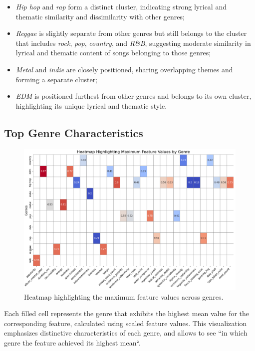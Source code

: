 \begin{itemize}
  \item \textit{Hip hop} and \textit{rap} form a distinct cluster, indicating
    strong lyrical and thematic similarity and dissimilarity with other genres;
  \item \textit{Reggae} is slightly separate from other genres but still
    belongs to the cluster that includes \textit{rock}, \textit{pop},
    \textit{country}, and \textit{R\&B}, suggesting moderate similarity in
    lyrical and thematic content of songs belonging to those genres;
  \item \textit{Metal} and \textit{indie} are closely positioned, sharing
    overlapping themes and forming a  separate cluster;
  \item \textit{EDM} is positioned furthest from other genres and belongs to
    its own cluster, highlighting its unique lyrical and thematic style.
\end{itemize}

\subsection{Top Genre Characteristics}
\begin{center}
\begin{figure}[H]
  \centering
  \includegraphics[width=6in]{img/heatmap_max_feature_values_by_genre.png}
  \caption{Heatmap highlighting the maximum feature values across genres.}
  \label{Figure:dendrogram_spotify_features}
\end{figure}
\end{center}
Each filled cell represents the genre that exhibits the highest mean value for
the corresponding feature, calculated using scaled feature values. This
visualization emphasizes distinctive characteristics of each genre, and allows
to see ``in  which genre the feature achieved its highest mean``.

